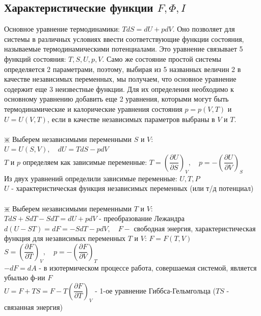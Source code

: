 \begin{multicols*}{2}
		\section{Характеристические функции $F, \Phi, I$}

		Основное уравнение термодинамики: $TdS = dU + pdV$. Оно позволяет для системы в различных условиях ввести соответствующие функции состояния, называемые термодинамическими потенциалами. Это уравнение связывает 5 функций состояния: $T, S, U, p, V$. Само же состояние простой системы определяется 2 параметрами, поэтому, выбирая из 5 названных величин 2 в качестве независимых переменных, мы получаем, что основное уравнение содержит еще 3 неизвестные функции. Для их определения необходимо к основному уравнению добавить еще 2 уравнения, которыми могут быть термодинамические и калорические уравнения состояния $p = p(V, T)$ и $U = U(V, T)$, если в качестве независимых параметров выбраны в $V$ и $T$.\\\\

		$\divideontimes$ Выберем независимыми переменными $S$ и $V$:\\
		$U = U(S,V), \quad dU = TdS - pdV$\\
		$T$ и $p$ определяем как зависимые переменные: $T = \left(\dfrac{\partial U}{\partial S}\right)_V, \quad p = - \left(\dfrac{\partial U}{\partial V}\right)_S$\\
		Из двух уравнений определили зависимые переменные: $U, T, P$\\
		$U$ - характеристическая функция независимых переменных (или т/д потенциал)\\\\

		$\divideontimes$ Выберем независимыми переменными $T$ и $V$:\\
		$TdS+SdT-SdT = dU+pdV$ - преобразование Лежандра\\
		$d(U-ST) = dF = -SdT - pdV, \quad F -$ свободная энергия, характеристическая функция для независимых переменных $T$ и $V$: $F = F(T, V)$\\
		$S = \left(\dfrac{\partial F}{\partial T}\right)_V, \quad p = - \left(\dfrac{\partial F}{\partial V}\right)_T$\\	
		$-dF = dA$ - в изотермическом процессе работа, совершаемая системой, является убылью ф-ии $F$\\
		$U = F+TS = F-T\left(\dfrac{\partial F}{\partial T}\right)_V$ - 1-ое уравнение Гиббса-Гельмгольца ($TS$ - связанная энергия)\\\\


\end{multicols*}
